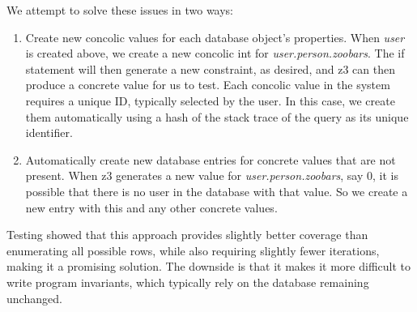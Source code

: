 \documentclass{scrartcl}
\begin{document}
\begin{enumerate}
We attempt to solve these issues in two ways:
\begin{enumerate}
  \item Create new concolic values for each database object's properties. When
    \textit{user} is created above, we create a new concolic int for
    \textit{user.person.zoobars}. The if statement will then generate a
    new constraint, as desired, and z3 can then produce a concrete value for us
    to test. Each concolic value in the system requires a unique ID, typically
    selected by the user. In this case, we create them automatically using a
    hash of the
    stack trace of the query as its unique identifier.
  \item Automatically create new database entries for concrete values that are
    not present. When z3 generates a new value for \textit{user.person.zoobars},
    say 0, it is possible that there is no user in the database with that value.
    So we create a new entry with this and any other concrete values.
\end{enumerate}


Testing showed that this approach provides slightly better coverage than enumerating all possible
rows, while also requiring slightly fewer iterations, making it a promising
solution. The downside is that it makes it more difficult to write program
invariants, which typically rely on the database remaining unchanged.

\end{enumerate}
\end{document}
